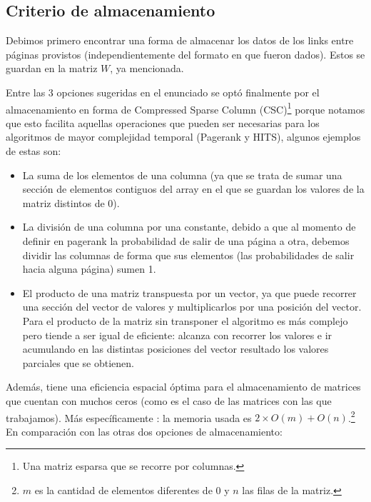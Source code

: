 \documentclass[a4paper]{article}
\begin{document}
\subsection{Criterio de almacenamiento}
Debimos primero encontrar una forma de almacenar los datos de los links entre p\'{a}ginas provistos (independientemente del formato en que fueron dados). Estos se guardan en la matriz $W$, ya mencionada.

Entre las 3 opciones sugeridas en el enunciado se opt\'{o} finalmente por el almacenamiento en forma de Compressed Sparse Column (CSC)\footnote{Una matriz esparsa que se recorre por columnas.} porque notamos que esto facilita aquellas operaciones que pueden ser necesarias para los algoritmos de mayor complejidad temporal (Pagerank y HITS), algunos ejemplos de estas son:

\begin{itemize}

\item La suma de los elementos de una columna (ya que se trata de sumar una secci\'{o}n de elementos contiguos del array en el que se guardan los valores de la matriz distintos de 0).

\item La divisi\'{o}n de una columna por una constante, debido a que al momento de definir en pagerank la probabilidad de salir de una p\'{a}gina a otra, debemos dividir las columnas de forma que sus elementos (las probabilidades de salir hacia alguna p\'{a}gina) sumen 1.

\item El producto de una matriz transpuesta por un vector, ya que puede recorrer una sección del vector de valores y multiplicarlos por una posición del vector. Para el producto de la matriz sin transponer el algoritmo es más complejo pero tiende a ser igual de eficiente: alcanza con recorrer los valores e ir acumulando en las distintas posiciones del vector resultado los valores parciales que se obtienen.

\end{itemize}

Además, tiene una eficiencia espacial \'{o}ptima para el almacenamiento de matrices que cuentan con muchos ceros (como es el caso de las matrices con las que trabajamos). M\'{a}s espec\'{i}ficamente : la memoria usada es $2 \times  O(m)+O(n)$.\footnote{$m$ es la cantidad de elementos diferentes de 0 y $n$ las filas de la matriz.} \\ 

En comparaci\'{o}n con las otras dos opciones de almacenamiento:
\end{document}

